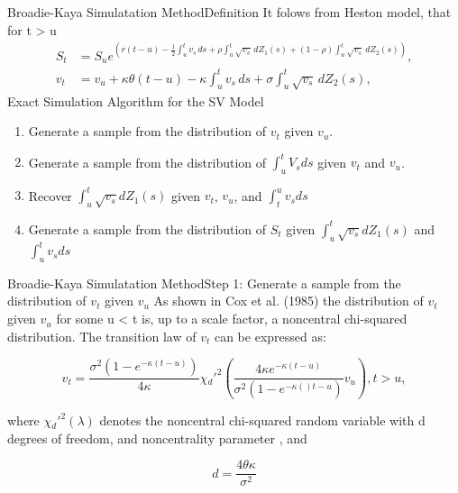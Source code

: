 \begin{frame}{Broadie-Kaya Simulatation Method}{Definition}
    It folows from Heston model, that for t > u
    \begin{align}
         S_t &= S_u e^{\left( r(t-u)-\frac{1}{2} \int_{u}^{t} v_s \, ds  + \rho\int_{u}^{t} \sqrt{v_s} \, dZ_1(s) + (1-\rho)\int_{u}^{t} \sqrt{v_s} \, dZ_2(s)  \right)}, \label{BK:Price_int} \\
         v_t &= v_u + \kappa\theta(t-u) - \kappa \int_{u}^{t} v_s \, ds + \sigma\int_{u}^{t} \sqrt{v_s} \, dZ_2(s), \label{BK:Vol_int}
    \end{align}
    Exact Simulation Algorithm for the SV Model
    \begin{enumerate}
        \item[Step 1] Generate a sample from the distribution of $v_t$ given $v_u$.
        \item[Step 2] Generate a sample from the distribution of $\int_{u}^t V_s ds$ given $v_t$ and $v_u$.
        \item[Step 3] Recover $\int_{u}^t \sqrt{v_s} dZ_1(s)$ given $v_t$, $v_u$, and
        $\int_{t}^u v_s ds$
        \item[Step 4] Generate a sample from the distribution of $S_t$ given $\int_{u}^t \sqrt{v_s} dZ_1(s)$ and $\int_{u}^t v_s ds$
    \end{enumerate}
\end{frame}

\begin{frame}{Broadie-Kaya Simulatation Method}{Step 1: Generate a sample from the distribution of $v_t$ given $v_u$}
    As shown in Cox et al. (1985) the distribution of $v_t$ given $v_u$ for some u < t is, up to a  scale factor, a noncentral chi-squared distribution. The transition law of $v_t$ can be expressed as:

    \begin{equation}
        v_t = \frac{\sigma^2(1-e^{-\kappa(t-u)})}{4\kappa}\chi{}_d'^{2}\left(\frac{4\kappa e^{-\kappa(t-u)}}{\sigma^2(1-e^{-\kappa()t-u})} v_u  \right), t > u , \label{BK:vol_law}
    \end{equation}

    where $\chi{}_d'^{2}(\lambda)$ denotes the noncentral chi-squared random
    variable with d degrees of freedom, and noncentrality
    parameter \lambda, and

    \begin{equation}
        d = \frac{4\theta\kappa}{\sigma^2} \label{BK:vol_law:parameter}
    \end{equation}
    
\end{frame}


